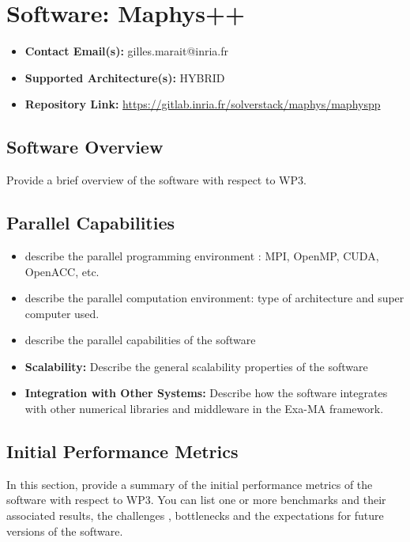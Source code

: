 \section{Software: Maphys++}
\label{sec:WP3:Maphys++:software}

\begin{itemize}
    \item \textbf{Contact Email(s):} gilles.marait@inria.fr
    \item \textbf{Supported Architecture(s):} HYBRID
    \item \textbf{Repository Link:} \href{https://gitlab.inria.fr/solverstack/maphys/maphyspp}{https://gitlab.inria.fr/solverstack/maphys/maphyspp}
\end{itemize}

\subsection{Software Overview}
\label{sec:WP3:Maphys++:summary}

Provide a brief overview of the software with respect to WP3.

\subsection{Parallel Capabilities}
\label{sec:WP3:Maphys++:performances}


\begin{itemize}
    \item describe the parallel programming  environment : MPI, OpenMP, CUDA, OpenACC, etc.
    \item describe the parallel computation environment: type of architecture and super computer used.
    \item describe the parallel capabilities of the software
    \item \textbf{Scalability:} Describe the general scalability properties of the software
    \item \textbf{Integration with Other Systems:} Describe how the software integrates with other numerical libraries and middleware in the Exa-MA framework.
\end{itemize}

\subsection{Initial Performance Metrics}
\label{sec:WP3:Maphys++:metrics}

In this section, provide a summary of the initial performance metrics of the software with respect to WP3.
You can list one or more benchmarks and their associated results, the challenges , bottlenecks and the expectations for future versions of the software.



